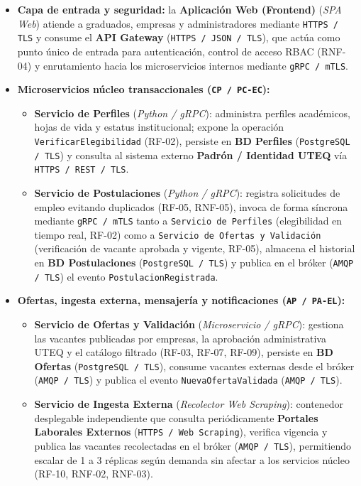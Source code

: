 \documentclass[11pt,a4paper]{article}
\begin{document}
\begin{itemize}
    \item \textbf{Capa de entrada y seguridad:} la \textbf{Aplicación Web (Frontend)} (\textit{SPA Web}) atiende a graduados, empresas y administradores mediante \texttt{HTTPS / TLS} y consume el \textbf{API Gateway} (\texttt{HTTPS / JSON / TLS}), que actúa como punto único de entrada para autenticación, control de acceso RBAC (RNF-04) y enrutamiento hacia los microservicios internos mediante \texttt{gRPC / mTLS}.
    \item \textbf{Microservicios núcleo transaccionales (\texttt{CP / PC-EC}):}
    \begin{itemize}
        \item \textbf{Servicio de Perfiles} (\textit{Python / gRPC}): administra perfiles académicos, hojas de vida y estatus institucional; expone la operación \texttt{VerificarElegibilidad} (RF-02), persiste en \textbf{BD Perfiles} (\texttt{PostgreSQL / TLS}) y consulta al sistema externo \textbf{Padrón / Identidad UTEQ} vía \texttt{HTTPS / REST / TLS}.
        \item \textbf{Servicio de Postulaciones} (\textit{Python / gRPC}): registra solicitudes de empleo evitando duplicados (RF-05, RNF-05), invoca de forma síncrona mediante \texttt{gRPC / mTLS} tanto a \texttt{Servicio de Perfiles} (elegibilidad en tiempo real, RF-02) como a \texttt{Servicio de Ofertas y Validación} (verificación de vacante aprobada y vigente, RF-05), almacena el historial en \textbf{BD Postulaciones} (\texttt{PostgreSQL / TLS}) y publica en el bróker (\texttt{AMQP / TLS}) el evento \texttt{Postulacion\-Registrada}.
    \end{itemize}
    \item \textbf{Ofertas, ingesta externa, mensajería y notificaciones (\texttt{AP / PA-EL}):}
    \begin{itemize}
        \item \textbf{Servicio de Ofertas y Validación} (\textit{Microservicio / gRPC}): gestiona las vacantes publicadas por empresas, la aprobación administrativa UTEQ y el catálogo filtrado (RF-03, RF-07, RF-09), persiste en \textbf{BD Ofertas} (\texttt{PostgreSQL / TLS}), consume vacantes externas desde el bróker (\texttt{AMQP / TLS}) y publica el evento \texttt{NuevaOferta\-Validada} (\texttt{AMQP / TLS}).
        \item \textbf{Servicio de Ingesta Externa} (\textit{Recolector Web Scraping}): contenedor desplegable independiente que consulta periódicamente \textbf{Portales Laborales Externos} (\texttt{HTTPS / Web Scraping}), verifica vigencia y publica las vacantes recolectadas en el bróker (\texttt{AMQP / TLS}), permitiendo escalar de 1 a 3 réplicas según demanda sin afectar a los servicios núcleo (RF-10, RNF-02, RNF-03).

\end{itemize}
\end{itemize}
\end{document}

